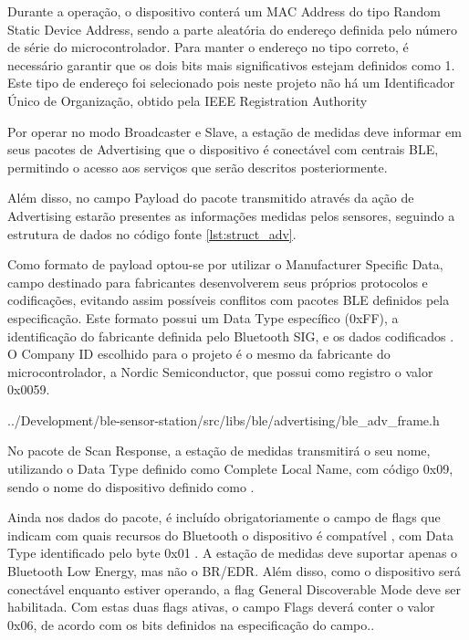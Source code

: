 
Durante a operação, o dispositivo conterá um MAC Address do tipo Random Static
Device Address, sendo a parte aleatória do endereço definida pelo número de série do
microcontrolador. Para manter o endereço no tipo correto, é necessário garantir
que os dois bits mais significativos estejam definidos como 1. Este tipo de
endereço foi selecionado pois neste projeto não há um Identificador Único de
Organização, obtido pela IEEE Registration Authority \cite{ble4core}


Por operar no modo Broadcaster e Slave, a estação de medidas deve informar em
seus pacotes de Advertising que o dispositivo é conectável com centrais BLE,
permitindo o acesso aos serviços que serão descritos posteriormente. 

Além disso, no campo Payload do pacote transmitido através da ação de
Advertising estarão presentes as informações medidas pelos sensores, seguindo a
estrutura de dados no código fonte \ref{lst:struct_adv}. 

Como formato de payload optou-se por utilizar o Manufacturer Specific Data,
campo destinado para fabricantes desenvolverem seus próprios protocolos e
codificações, evitando assim possíveis conflitos com pacotes BLE definidos pela
especificação. Este formato possui um Data Type específico
(0xFF)\cite{GAPDataTypes}, a identificação do fabricante definida pelo
Bluetooth SIG, e os dados codificados \cite{ble4sup}. O Company ID escolhido
para o projeto é o mesmo da fabricante do microcontrolador, a Nordic
Semiconductor, que possui como registro o valor 0x0059\cite{bleCompanyIds}.


{../Development/ble-sensor-station/src/libs/ble/advertising/ble_adv_frame.h}

No pacote de Scan Response, a estação de medidas transmitirá o seu nome,
utilizando o Data Type definido como Complete Local Name, com
código 0x09\cite{GAPDataTypes}, sendo o nome do dispositivo definido como
.

Ainda nos dados do pacote, é incluído obrigatoriamente o campo de
flags\cite{ble4core} que indicam com quais recursos do Bluetooth o dispositivo é
compatível \cite{ble4sup}, com Data Type identificado pelo byte 0x01
\cite{GAPDataTypes}.
A estação de medidas deve suportar apenas o Bluetooth Low Energy, mas não o
BR/EDR. Além disso, como o dispositivo será conectável enquanto estiver
operando, a flag General Discoverable Mode deve ser habilitada. Com estas duas
flags ativas, o campo Flags deverá conter o valor 0x06, de acordo com os bits
definidos na especificação do campo.\cite{ble4sup}.

